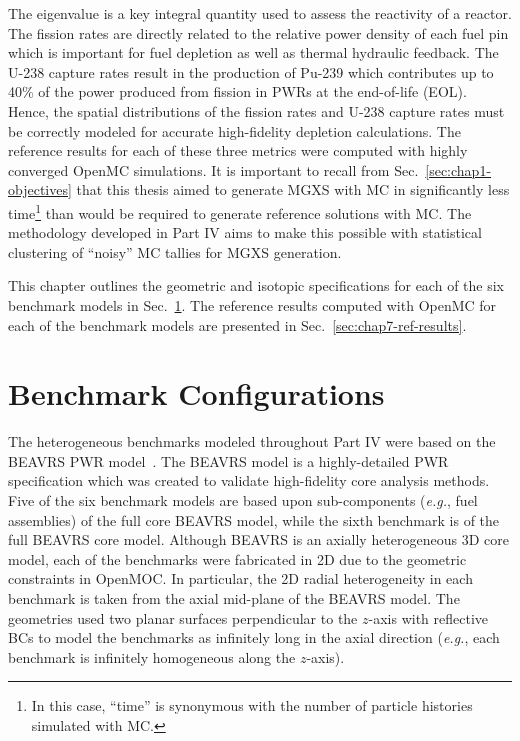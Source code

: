 The eigenvalue is a key integral quantity used to assess the reactivity of a reactor. The fission rates are directly related to the relative power density of each fuel pin which is important for fuel depletion as well as thermal hydraulic feedback. The U-238 capture rates result in the production of Pu-239 which contributes up to 40\% of the power produced from fission in \ac{PWR}s at the end-of-life (EOL). Hence, the spatial distributions of the fission rates and U-238 capture rates must be correctly modeled for accurate high-fidelity depletion calculations. The reference results for each of these three metrics were computed with highly converged OpenMC simulations. It is important to recall from Sec.~\ref{sec:chap1-objectives} that this thesis aimed to generate \ac{MGXS} with \ac{MC} in significantly less time\footnote{In this case, ``time'' is synonymous with the number of particle histories simulated with \ac{MC}.} than would be required to generate reference solutions with \ac{MC}. The methodology developed in Part IV aims to make this possible with statistical clustering of ``noisy'' \ac{MC} tallies for \ac{MGXS} generation.

This chapter outlines the geometric and isotopic specifications for each of the six benchmark models in Sec.~\ref{sec:chap7-benchmarks}. The reference results computed with OpenMC for each of the benchmark models are presented in Sec.~\ref{sec:chap7-ref-results}.


\section{Benchmark Configurations}
\label{sec:chap7-benchmarks}

The heterogeneous benchmarks modeled throughout Part IV were based on the \ac{BEAVRS} \ac{PWR} model~\cite{horelik2013beavrs}. The \ac{BEAVRS} model is a highly-detailed \ac{PWR} specification which was created to validate high-fidelity core analysis methods. Five of the six benchmark models are based upon sub-components (\textit{e.g.}, fuel assemblies) of the full core \ac{BEAVRS} model, while the sixth benchmark is of the full \ac{BEAVRS} core model. Although \ac{BEAVRS} is an axially heterogeneous 3D core model, each of the benchmarks were fabricated in 2D due to the geometric constraints in OpenMOC. In particular, the 2D radial heterogeneity in each benchmark is taken from the axial mid-plane of the \ac{BEAVRS} model. The geometries used two planar surfaces perpendicular to the $z$-axis with reflective \acp{BC} to model the benchmarks as infinitely long in the axial direction (\textit{e.g.}, each benchmark is infinitely homogeneous along the $z$-axis).

